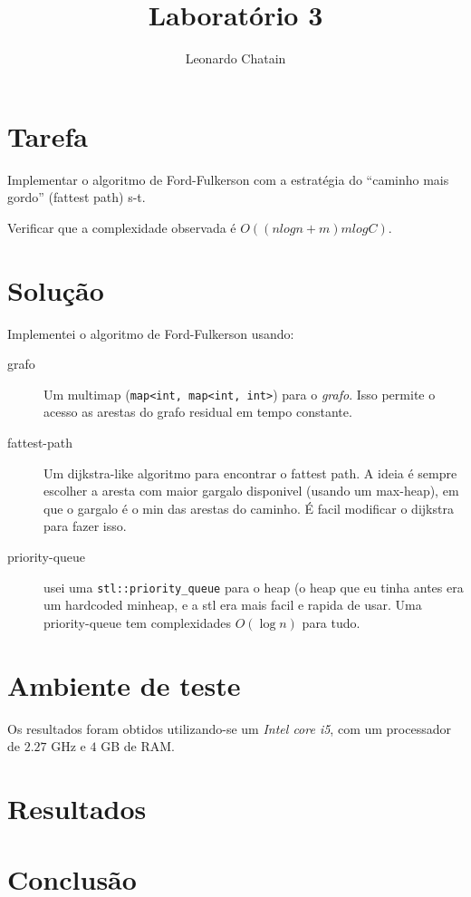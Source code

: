 \documentclass{article}
\title{Laboratório 3}
\author{Leonardo Chatain}
\begin{document}
\maketitle

\section{Tarefa}

Implementar o algoritmo de Ford-Fulkerson com a estratégia do ``caminho mais gordo'' (fattest path)
s-t.

Verificar que a complexidade observada é $ O((nlogn + m)m log C) $.

\section{Solução}

Implementei o algoritmo de Ford-Fulkerson usando:

\begin{description}
 \item[grafo] Um multimap (\texttt{map<int, map<int, int>}) para o \emph{grafo}. Isso permite o
acesso as arestas do grafo residual em tempo constante.

 \item[fattest-path] Um dijkstra-like algoritmo para encontrar o fattest path. A ideia é
sempre escolher a aresta com maior gargalo disponivel (usando um max-heap), em que o gargalo é o
min das arestas do caminho. É facil modificar o dijkstra para fazer isso.

 \item[priority-queue] usei uma \texttt{stl::priority\_queue} para o heap (o heap que eu tinha antes
era um hardcoded minheap, e a stl era mais facil e rapida de usar. Uma priority-queue tem
complexidades $O(\log n)$ para tudo.
\end{description}

\section{Ambiente de teste}

Os resultados foram obtidos utilizando-se um \emph{Intel core i5}, com um processador de $2.27$ GHz
e $4$ GB de RAM.

\section{Resultados}

\section{Conclusão}
\end{document}
